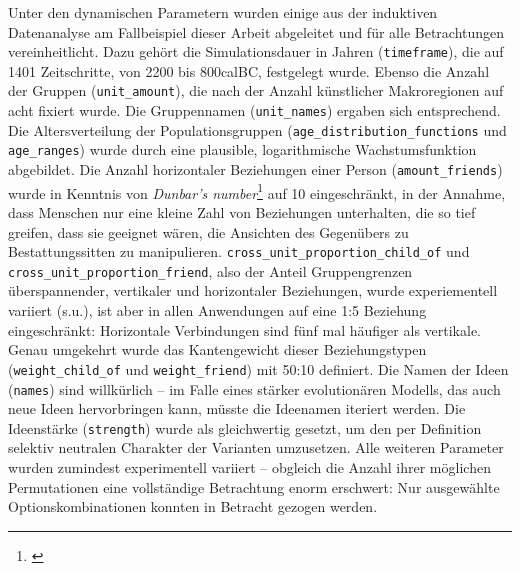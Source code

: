 \documentclass[openany,twoside,twocolumn]{book}
\let\rmarkdownfootnote\footnote%
\def\footnote{\protect\rmarkdownfootnote}
\begin{document}
Unter den dynamischen Parametern wurden einige aus der induktiven
Datenanalyse am Fallbeispiel dieser Arbeit abgeleitet und für alle
Betrachtungen vereinheitlicht. Dazu gehört die Simulationsdauer in
Jahren (\texttt{timeframe}), die auf 1401 Zeitschritte, von 2200 bis
800calBC, festgelegt wurde. Ebenso die Anzahl der Gruppen
(\texttt{unit\_amount}), die nach der Anzahl künstlicher Makroregionen
auf acht fixiert wurde. Die Gruppennamen (\texttt{unit\_names}) ergaben
sich entsprechend. Die Altersverteilung der Populationsgruppen
(\texttt{age\_distribution\_functions} und \texttt{age\_ranges}) wurde
durch eine plausible, logarithmische Wachstumsfunktion abgebildet. Die
Anzahl horizontaler Beziehungen einer Person (\texttt{amount\_friends})
wurde in Kenntnis von \emph{Dunbar's number}\footnote{\textcite{dunbar_neocortex_1992}}
auf 10 eingeschränkt, in der Annahme, dass Menschen nur eine kleine Zahl
von Beziehungen unterhalten, die so tief greifen, dass sie geeignet
wären, die Ansichten des Gegenübers zu Bestattungssitten zu
manipulieren. \texttt{cross\_unit\_proportion\_child\_of} und
\texttt{cross\_unit\_proportion\_friend}, also der Anteil Gruppengrenzen
überspannender, vertikaler und horizontaler Beziehungen, wurde
experiementell variiert (s.u.), ist aber in allen Anwendungen auf eine
1:5 Beziehung eingeschränkt: Horizontale Verbindungen sind fünf mal
häufiger als vertikale. Genau umgekehrt wurde das Kantengewicht dieser
Beziehungstypen (\texttt{weight\_child\_of} und \texttt{weight\_friend})
mit 50:10 definiert. Die Namen der Ideen (\texttt{names}) sind
willkürlich -- im Falle eines stärker evolutionären Modells, das auch
neue Ideen hervorbringen kann, müsste die Ideenamen iteriert werden. Die
Ideenstärke (\texttt{strength}) wurde als gleichwertig gesetzt, um den
per Definition selektiv neutralen Charakter der Varianten umzusetzen.
Alle weiteren Parameter wurden zumindest experimentell variiert --
obgleich die Anzahl ihrer möglichen Permutationen eine vollständige
Betrachtung enorm erschwert: Nur ausgewählte Optionskombinationen
konnten in Betracht gezogen werden.
\end{document}
